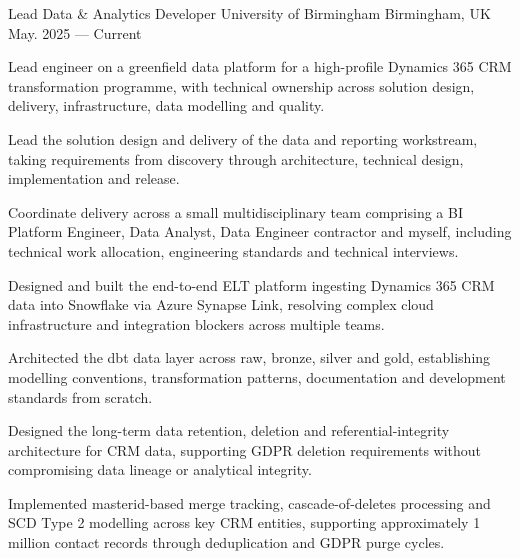 
\begin{cventries}

  \cventry
  {Lead Data \& Analytics Developer} %
  {University of Birmingham } %
  {Birmingham, UK} %
  {May. 2025 --- Current} %
  {
    \begin{cvitems}
    \item {Lead engineer on a greenfield data platform for a high-profile Dynamics 365 CRM transformation programme, with technical ownership across solution design, delivery, infrastructure, data modelling and quality.}
    \item {Lead the solution design and delivery of the data and reporting workstream, taking requirements from discovery through architecture, technical design, implementation and release.}
    \item {Coordinate delivery across a small multidisciplinary team comprising a BI Platform Engineer, Data Analyst, Data Engineer contractor and myself, including technical work allocation, engineering standards and technical interviews.}
    \item {Designed and built the end-to-end ELT platform ingesting Dynamics 365 CRM data into Snowflake via Azure Synapse Link, resolving complex cloud infrastructure and integration blockers across multiple teams.}
    \item {Architected the dbt data layer across raw, bronze, silver and gold, establishing modelling conventions, transformation patterns, documentation and development standards from scratch.}
    \item {Designed the long-term data retention, deletion and referential-integrity architecture for CRM data, supporting GDPR deletion requirements without compromising data lineage or analytical integrity.}
    \item {Implemented masterid-based merge tracking, cascade-of-deletes processing and SCD Type 2 modelling across key CRM entities, supporting approximately 1 million contact records through deduplication and GDPR purge cycles.}

\end{cvitems}}
\end{cventries}
